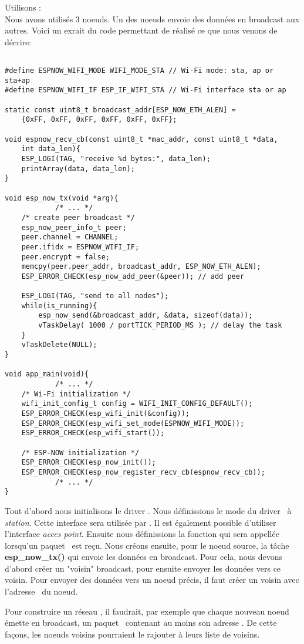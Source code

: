         Utilisons \espnow:\\
        Nous avons utilisés 3 noeuds. Un des noeuds envoie des données en broadcast aux autres.
        Voici un exrait du code permettant de réalisé ce que nous venons de décrire:
        \begin{verbatim}

#define ESPNOW_WIFI_MODE WIFI_MODE_STA // Wi-Fi mode: sta, ap or sta+ap
#define ESPNOW_WIFI_IF ESP_IF_WIFI_STA // Wi-Fi interface sta or ap

static const uint8_t broadcast_addr[ESP_NOW_ETH_ALEN] = 
    {0xFF, 0xFF, 0xFF, 0xFF, 0xFF, 0xFF};

void espnow_recv_cb(const uint8_t *mac_addr, const uint8_t *data,
    int data_len){
    ESP_LOGI(TAG, "receive %d bytes:", data_len);
    printArray(data, data_len);
}

void esp_now_tx(void *arg){
            /* ... */
    /* create peer broadcast */
    esp_now_peer_info_t peer;
    peer.channel = CHANNEL;
    peer.ifidx = ESPNOW_WIFI_IF;
    peer.encrypt = false;
    memcpy(peer.peer_addr, broadcast_addr, ESP_NOW_ETH_ALEN);
    ESP_ERROR_CHECK(esp_now_add_peer(&peer)); // add peer

    ESP_LOGI(TAG, "send to all nodes");
    while(is_running){
        esp_now_send(&broadcast_addr, &data, sizeof(data));
        vTaskDelay( 1000 / portTICK_PERIOD_MS ); // delay the task
    }
    vTaskDelete(NULL); 
}

void app_main(void){    
            /* ... */
    /* Wi-Fi initialization */
    wifi_init_config_t config = WIFI_INIT_CONFIG_DEFAULT();
    ESP_ERROR_CHECK(esp_wifi_init(&config));
    ESP_ERROR_CHECK(esp_wifi_set_mode(ESPNOW_WIFI_MODE));
    ESP_ERROR_CHECK(esp_wifi_start());
    
    /* ESP-NOW initialization */
    ESP_ERROR_CHECK(esp_now_init());
    ESP_ERROR_CHECK(esp_now_register_recv_cb(espnow_recv_cb));
            /* ... */
}
        \end{verbatim}
Tout d'abord nous initialisons le driver \wifi. Nous définissions le mode du driver \wifi\ à
\textit{station}. Cette interface sera utilisée par \espnow. Il est également possible d'utiliser 
l'interface \textit{acces point}. 
Ensuite nous définissions la fonction qui sera appellée lorsqu'un paquet \espnow\ est reçu.
Nous créons ensuite, pour le noeud source, la tâche \textbf{esp\_now\_tx()} qui envoie les données en broadcast.
Pour cela, nous devons d'abord créer un "voisin" broadcast, pour ensuite envoyer les données vers ce voisin.
Pour envoyer des données vers un noeud précis, il faut créer un voisin avec l'adresse \mac\ du noeud.

Pour construire un réseau \mesh, il faudrait, par exemple que chaque nouveau noeud émette en broadcast, un paquet \espnow\ 
contenant au moins son adresse \mac. De cette façons, les noeuds voisins pourraient le rajouter à leurs
liste de voisins.